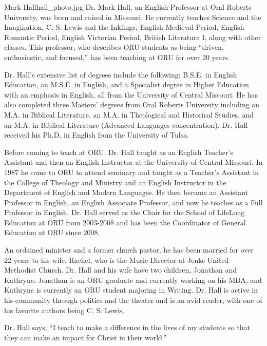 \begin{authorbio}{Mark Hall}{hall_photo.jpg}
Dr. Mark Hall, an English Professor at Oral Roberts University, was born and raised in Missouri. He currently teaches Science and the Imagination, C. S. Lewis and the Inklings, English Medieval Period, English Romantic Period, English Victorian Period, British Literature I, along with other classes. This professor, who describes ORU students as being “driven, enthusiastic, and focused,” has been teaching at ORU for over 20 years.

Dr. Hall’s extensive list of degrees include the following: B.S.E. in English Education, an M.S.E. in English, and a Specialist degree in Higher Education with an emphasis in English, all from the University of Central Missouri.  He has also completed three Masters' degrees from Oral Roberts University including an M.A. in Biblical Literature, an M.A. in Theological and Historical Studies, and an M.A. in  Biblical Literature (Advanced Languages concentration).  Dr. Hall received his Ph.D. in English from the University of Tulsa.

Before coming to teach at ORU, Dr. Hall taught as an English Teacher’s Assistant and then an English Instructor at the University of Central Missouri.  In 1987 he came to ORU to attend seminary and taught as a Teacher’s Assistant in the College of Theology and Ministry and an English Instructor in the Department of English and Modern Languages.  He then became an Assistant Professor in English, an English Associate Professor, and now he teaches as a Full Professor in English.  Dr. Hall served as the Chair for the School of LifeLong Education at ORU from 2003-2008 and has been the Coordinator of General Education at ORU since 2008.

An ordained minister and a former church pastor, he has been married for over 22 years to his wife, Rachel, who is the Music Director at Jenks United Methodist Church. Dr. Hall and his wife have two children, Jonathan and Kathryne. Jonathan is an ORU graduate and currently working on his MBA, and Kathryne is currently an ORU student majoring in Writing.  Dr. Hall is active in his community through politics and the theater and is an avid reader, with one of his favorite authors being C. S. Lewis.

Dr. Hall says, “I teach to make a difference in the lives of my students so that they can make an impact for Christ in their world.”
\end{authorbio}

